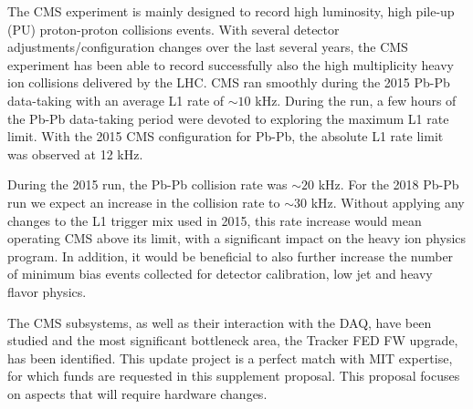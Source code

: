 The CMS experiment is mainly designed to record high luminosity, high pile-up (PU) proton-proton collisions events.  With several detector adjustments/configuration changes over the last several years, the CMS experiment has been able to record successfully also the high multiplicity heavy ion collisions delivered by the LHC. CMS ran smoothly during the 2015 Pb-Pb data-taking with an average L1 rate of $\sim 10$ kHz. During the run, a few hours of the Pb-Pb data-taking period were devoted to exploring the maximum L1 rate limit. With the 2015 CMS configuration for Pb-Pb, the absolute L1 rate limit was observed at 12 kHz. 

During the 2015 run, the Pb-Pb collision rate was $\sim 20$ kHz. For the 2018 Pb-Pb run we expect an increase in the collision rate to $\sim 30$ kHz. Without applying any changes to the L1 trigger mix used in 2015, this rate increase would mean operating CMS above its limit, with a significant impact on the heavy ion physics program. In addition, it would be beneficial to also further increase the number of minimum bias events collected for detector calibration, low \pt jet and heavy flavor physics. 

The CMS subsystems, as well as their interaction with the DAQ, have been studied and the most significant bottleneck area, the Tracker FED FW upgrade, has been identified. This update project is a perfect match with MIT expertise, for which funds are requested in this supplement proposal. This proposal focuses on aspects that will require hardware changes. 

